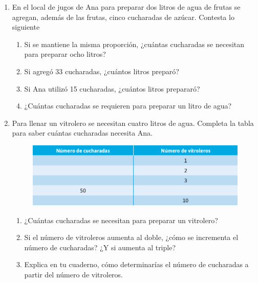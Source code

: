 \documentclass[11pt]{book}
\begin{document}
\begin{enumerate}
  \item En el local de jugos de Ana para preparar dos litros de agua de frutas se agregan,
        además de las frutas, cinco cucharadas de azúcar. Contesta lo siguiente
        \begin{enumerate}
          \item Si se mantiene la misma proporción, ¿cuántas cucharadas se necesitan para preparar ocho litros?
          \item Si agregó 33 cucharadas, ¿cuántos litros preparó?
          \item Si Ana utilizó 15 cucharadas, ¿cuántos litros prepararó?
          \item ¿Cuántas cucharadas se requieren para preparar un litro de agua?
        \end{enumerate}
  \item  Para llenar un vitrolero se necesitan cuatro litros de agua. Completa la tabla para
        saber cuántas cucharadas necesita Ana.
        \begin{figure}[H]
          \centering
          \includegraphics[width=0.8\linewidth]{tabla_vitrolero.png}
          \label{tab:tabla_vitrolero}
        \end{figure}
        \begin{enumerate}
          \item ¿Cuántas cucharadas se necesitan para preparar un vitrolero?
          \item Si el número de vitroleros aumenta al doble, ¿cómo se incrementa el número de
                cucharadas? ¿Y si aumenta al triple?
          \item Explica en tu cuaderno, cómo determinarías el número de cucharadas a partir del
                número de vitroleros.
        \end{enumerate}


\end{enumerate}
\end{document}
